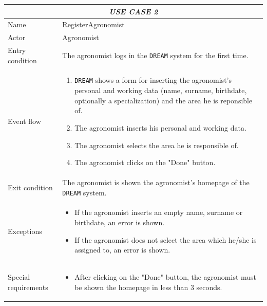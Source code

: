 \documentclass{article}
\begin{document}
\centering
\begin{longtable}{|p{3.5cm}|m{8cm}|}
 \hline
 \multicolumn{2}{|c|}{\cellcolor{white}\emph{USE CASE 2}} \\
 \endfirsthead
 \endhead
 \endfoot
 \endlastfoot
 \hline
 Name & RegisterAgronomist\\
 \hline
 Actor & Agronomist\\
 \hline
 Entry condition & The agronomist logs in the \verb|DREAM| system for the first time.\\
 \hline
 Event flow & \begin{enumerate}
    \item \verb|DREAM| shows a form for inserting the agronomist's personal and working data (name, surname, birthdate, optionally a specialization) and the area he is reponsible of.
    \item The agronomist inserts his personal and working data.
    \item The agronomist selects the area he is responsible of.
    \item The agronomist clicks on the "Done" button.
 \end{enumerate}\\
 \hline
 Exit condition & The agronomist is shown the agronomist's homepage of the \verb|DREAM| system.\\
 \hline
 Exceptions & \begin{itemize}
     \item If the agronomist inserts an empty name, surname or birthdate, an error is shown.
     \item If the agronomist does not select the area which he/she is assigned to, an error is shown.
 \end{itemize}\\
 \hline
 Special requirements & \begin{itemize}
     \item After clicking on the "Done" button, the agronomist must be shown the homepage in less than 3 seconds.
 \end{itemize}\\
 \hline
\end{longtable}
\end{document}

